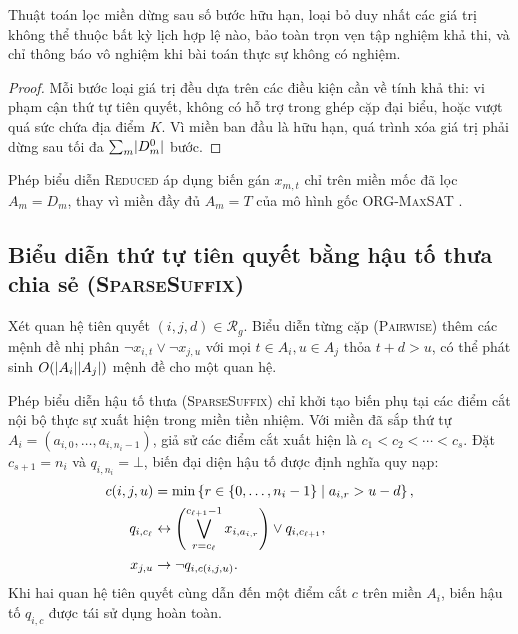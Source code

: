 \begin{proposition}
\label{prop:b2b-domain-preservation}
Thuật toán lọc miền dừng sau số bước hữu hạn, loại bỏ duy nhất các giá trị không thể thuộc bất kỳ lịch hợp lệ nào, bảo toàn trọn vẹn tập nghiệm khả thi, và chỉ thông báo vô nghiệm khi bài toán thực sự không có nghiệm.
\end{proposition}

\begin{proof}
Mỗi bước loại giá trị đều dựa trên các điều kiện cần về tính khả thi: vi phạm cận thứ tự tiên quyết, không có hỗ trợ trong ghép cặp đại biểu, hoặc vượt quá sức chứa địa điểm \(K\). Vì miền ban đầu là hữu hạn, quá trình xóa giá trị phải dừng sau tối đa \(\sum_{m}\lvert D_m^0\rvert\) bước.
\end{proof}

Phép biểu diễn \mbox{\textsc{Reduced}} áp dụng biến gán \(x_{m,t}\) chỉ trên miền mốc đã lọc \(A_m = D_m\), thay vì miền đầy đủ \(A_m = T\) của mô hình gốc \mbox{\textsc{ORG-MaxSAT}} \parencite{bofill2022b2b}.

\subsection{Biểu diễn thứ tự tiên quyết bằng hậu tố thưa chia sẻ (\textsc{SparseSuffix})}

Xét quan hệ tiên quyết \((i,j,d)\in\mathcal R_g\). Biểu diễn từng cặp (\mbox{\textnormal{\textsc{Pairwise}}}) thêm các mệnh đề nhị phân \(\neg x_{i,t}\lor\neg x_{j,u}\) với mọi \(t\in A_i, u\in A_j\) thỏa \(t+d>u\), có thể phát sinh \(O(\lvert A_i\rvert\lvert A_j\rvert)\) mệnh đề cho một quan hệ.

Phép biểu diễn hậu tố thưa (\mbox{\textnormal{\textsc{SparseSuffix}}}) \parencite{nguyen2026compactsatmaxsatencodings} chỉ khởi tạo biến phụ tại các điểm cắt nội bộ thực sự xuất hiện trong miền tiền nhiệm. Với miền đã sắp thứ tự \(A_i = (a_{i,0},\ldots,a_{i,n_i-1})\), giả sử các điểm cắt xuất hiện là \(c_1 < c_2 < \cdots < c_s\). Đặt \(c_{s+1}=n_i\) và \(q_{i,n_i}=\bot\), biến đại diện hậu tố được định nghĩa quy nạp:
\begin{align}
  c(i,j,u) &= \min\left\{r\in\left\{0,\ldots,n_i-1\right\} \;\middle|\; a_{i,r} > u - d\right\}, \notag\\
  q_{i,c_\ell} &\leftrightarrow \left(\bigvee_{r=c_\ell}^{c_{\ell+1}-1} x_{i,a_{i,r}}\right) \lor q_{i,c_{\ell+1}}, \label{eq:b2b-sparse-suffix}\\
  x_{j,u} &\rightarrow \neg q_{i,c(i,j,u)}. \label{eq:b2b-suffix-link}
\end{align}
Khi hai quan hệ tiên quyết cùng dẫn đến một điểm cắt \(c\) trên miền \(A_i\), biến hậu tố \(q_{i,c}\) được tái sử dụng hoàn toàn.

